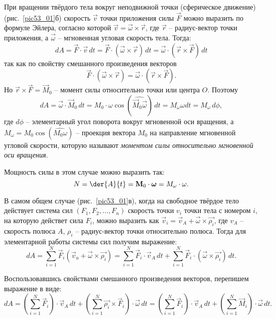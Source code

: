 При вращении твёрдого тела вокруг неподвижной точки 
(сферическое движение) (рис.~\ref{pic53_01}б) скорость \( \vec{v} \) точки 
приложения силы \( \vec{F} \) можно выразить по 
формуле Эйлера, согласно которой \( \vec{v} = \vec{\omega}\times\vec{r} \), где 
\( \vec{r} \) -- радиус-вектор точки приложения, а \( \vec{\omega} \) -- 
мгновенная угловая скорость тела. Тогда:
\[ 
	dA = \vec{F}\cdot\vec{v}\,dt = 
	\vec{F}\cdot\left(\vec{\omega}\times\vec{r}\right)\,dt =
	\vec{\omega}\cdot\left(\vec{r}\times\vec{F}\right)\,dt
\]
так как по свойству смешанного произведения векторов 
\[
	\vec{F}\cdot\left(\vec{\omega}\times\vec{r}\right) = \vec{\omega}\cdot\left(\vec{r}\times\vec{F}\right).
\] 
Но \( \vec{r}\times\vec{F} = \vec{M}_0 \) -- момент силы относительно точки или 
центра \( O \). Поэтому 
\[ 
	dA = \vec{\omega}\cdot\vec{M}_0\,dt = 
	M_0\cdot\omega\cos(\widehat{\vec{M}_0\vec{\omega}})\,dt =
	M_\omega\omega dt = M_\omega\,d\phi,
\]
где \( d\phi \) -- элементарный угол поворота вокруг мгновенной оси 
вращения, а \( M_\omega = M_0\cos(\widehat{M_0\omega}) \) -- 
проекция вектора \( M_0 \) на направление мгновенной угловой 
скорости, которую называют \emph{моментом силы относительно мгновенной 
оси вращения}.

Мощность силы в этом случае можно выразить так:
\[ 
	N = \der{A}{t} = \vec{M}_{0}\cdot\vec{\omega} = M_\omega\cdot\omega.
\]


В самом общем случае (рис.~\ref{pic53_01}в), когда на свободное твёрдое тело 
действует система сил \( \left( F_1, F_2, ..., F_n \right) \) скорость 
точки \( v_i \) точки тела с номером \( i \), на которую действет сила 
\( F_i \), можно выразить как 
\( \vec{v}_{i} = \vec{v}_A + \vec{\omega}\times\vec{\rho_i} \), 
где \( v_A \) -- скорость полюса \( A \), \( \rho_i \) -- радиус-вектор 
точки относительно полюса. Тогда для элементарной работы системы сил 
получим выражение:
\[ 
	dA = \sum_{i=1}^{N} \vec{F}_i
	(\vec{v}_{a} + \vec{\omega}\times\vec{\rho_i}) =
	\sum_{i=1}^{N}\vec{F}_i\cdot\vec{v}_A\,dt + 
	\sum_{i=1}^{N}\vec{F}_i\cdot(\vec{\omega}\times\vec{\rho_i})\,dt.
\]

Воспользовавшись свойствами смешанного произведения векторов, перепишем 
выражение в виде:
\[ 
	dA = \left( \sum_{i=1}^{N}\vec{F}_i \right)\cdot\vec{v}_A\,dt + 
	\left( \sum_{i=1}^{N} \vec{\rho_i}\times\vec{F}_i\right)\cdot
	\vec{\omega}\,dt = \left( \sum_{i=1}^{N}\vec{F}_i \right)\cdot\vec{v}_A\,dt
	+ \left( \sum_{i=1}^{N} \vec{M}_{i} \right)\cdot\vec{\omega}\,dt.
\]

